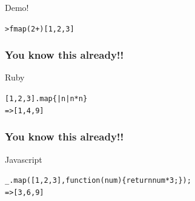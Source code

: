 \documentclass[12pt, xcolor=table]{beamer}
\begin{document}
\begin{frame}{Demo!}
        \begin{alltt}
            > fmap (2 +) [1,2,3]
        \end{alltt}
\end{frame}

\begin{frame}
    \frametitle{You know this already!!}
    \begin{block}{Ruby}
        \begin{alltt}
            [1, 2, 3].map \{ |n| n * n \}
            \newline
            \newline
            => [1, 4, 9]
        \end{alltt}
    \end{block}
\end{frame}

\begin{frame}
    \frametitle{You know this already!!}
    \begin{block}{Javascript}
        \begin{alltt}
            \_.map([1, 2, 3], function(num)\{return num*3;\});
            \newline
            \newline
            => [3, 6, 9]
        \end{alltt}
    \end{block}
\end{frame}
\end{document}
